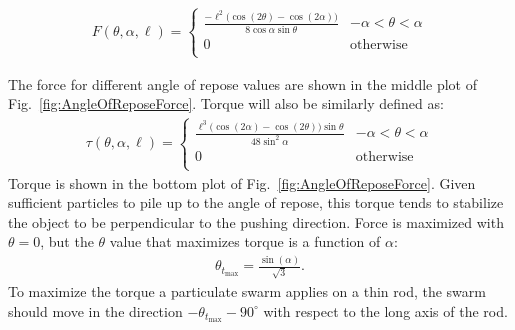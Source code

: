 \begin{align}
F(\theta,\alpha,\ell) =\left\{
\begin{array}{ll}
\frac{-\ell^2\Big(\cos(2\theta)-\cos(2\alpha)\Big)}{8\cos\alpha\sin{\theta}} &   -\alpha<\theta<\alpha\\
0 &    \textrm{otherwise}\\
\end{array} 
\right.
\end{align}



The force for different angle of repose values are shown in the middle plot of Fig.~\ref{fig:AngleOfReposeForce}. 
Torque will also be similarly defined as:
\begin{align}
\tau(\theta, \alpha, \ell) =\left\{
\begin{array}{ll}
\frac{\ell^3\Big(\cos(2\alpha)-\cos(2\theta)\Big)\sin{\theta} }{48\sin^2\alpha}&   -\alpha<\theta<\alpha\\
0 &    \textrm{otherwise}\\
\end{array} 
\right.
\end{align}
Torque is shown in the bottom plot of Fig.~\ref{fig:AngleOfReposeForce}.
 Given sufficient particles to pile up to the angle of repose, this torque tends to stabilize the object to be perpendicular to the pushing direction.
Force is maximized with $\theta=0$, but the $\theta$ value that maximizes torque is a function of $\alpha$:
\begin{align}
\theta_{t_{\max}} = \frac{\sin(\alpha)}{\sqrt{3}}.
\end{align}
To maximize the torque a particulate swarm applies on a thin rod, the swarm should move in the direction $-\theta_{t_{\max}} - 90^\circ$ with respect to the long axis of the rod.



